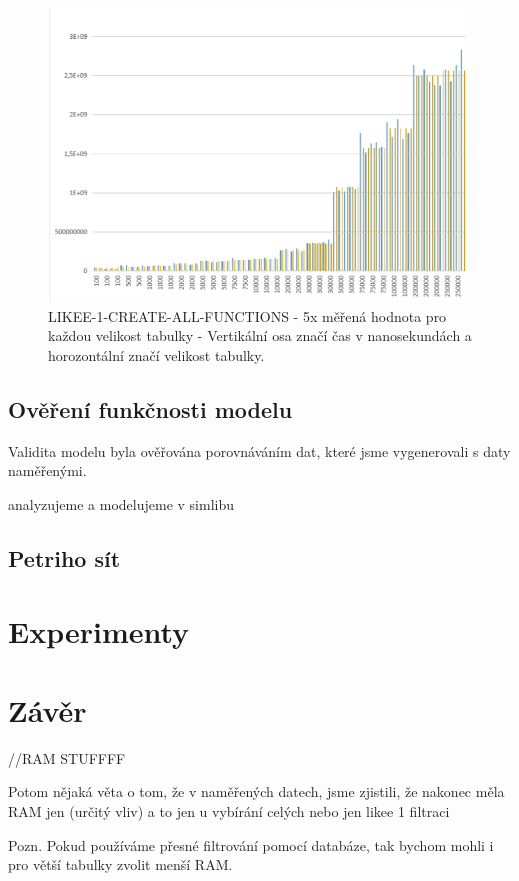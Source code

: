 \documentclass[a4paper, 11pt]{article}
\begin{document}
\begin{figure}[H]
\centering
\includegraphics[width=150mm]{images/LIKEE-1-CREATE-ALL-FUNCTIONS.png}
\caption{LIKEE-1-CREATE-ALL-FUNCTIONS - 5x měřená hodnota pro každou velikost tabulky - Vertikální osa značí čas v nanosekundách a horozontální značí velikost tabulky.}
\label{sec:obr2}
\end{figure}

\subsection{Ověření funkčnosti modelu}
Validita modelu byla ověřována porovnáváním dat, které jsme vygenerovali s daty naměřenými.

analyzujeme a modelujeme v simlibu\cite{simlib_web, simlib_zdroj}

\subsection{Petriho sít}

\section{Experimenty}

\section{Závěr}

//RAM STUFFFF

Potom nějaká věta o tom, že v naměřených datech, jsme zjistili, že nakonec měla RAM jen (určitý vliv) a to jen u vybírání celých nebo jen likee 1 filtraci

Pozn. Pokud používáme přesné filtrování pomocí databáze, tak bychom mohli i pro větší tabulky zvolit menší RAM. 


\pagebreak
\newpage

\def\refname{Literatura}

\end{document}
